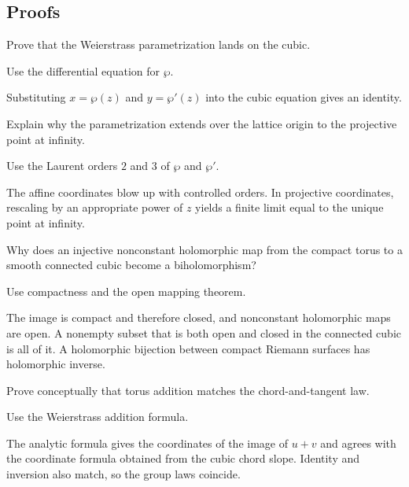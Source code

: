 \subsection*{Proofs}

\begin{exercise}\label{exr:iv31-expand-06}
Prove that the Weierstrass parametrization lands on the cubic.
\end{exercise}
\begin{hint}
Use the differential equation for \(\wp\).
\end{hint}
\begin{solution}
Substituting \(x=\wp(z)\) and \(y=\wp'(z)\) into the cubic equation gives an identity.
\end{solution}

\begin{exercise}\label{exr:iv31-expand-07}
Explain why the parametrization extends over the lattice origin to the projective point at infinity.
\end{exercise}
\begin{hint}
Use the Laurent orders \(2\) and \(3\) of \(\wp\) and \(\wp'\).
\end{hint}
\begin{solution}
The affine coordinates blow up with controlled orders. In projective coordinates, rescaling by an appropriate power of \(z\) yields a finite limit equal to the unique point at infinity.
\end{solution}

\begin{exercise}[Biholomorphism]\label{exr:iv31-expand-08}
Why does an injective nonconstant holomorphic map from the compact torus to a smooth connected cubic become a biholomorphism?
\end{exercise}
\begin{hint}
Use compactness and the open mapping theorem.
\end{hint}
\begin{solution}
The image is compact and therefore closed, and nonconstant holomorphic maps are open. A nonempty subset that is both open and closed in the connected cubic is all of it. A holomorphic bijection between compact Riemann surfaces has holomorphic inverse.
\end{solution}

\begin{exercise}\label{exr:iv31-expand-09}
Prove conceptually that torus addition matches the chord-and-tangent law.
\end{exercise}
\begin{hint}
Use the Weierstrass addition formula.
\end{hint}
\begin{solution}
The analytic formula gives the coordinates of the image of \(u+v\) and agrees with the coordinate formula obtained from the cubic chord slope. Identity and inversion also match, so the group laws coincide.
\end{solution}

